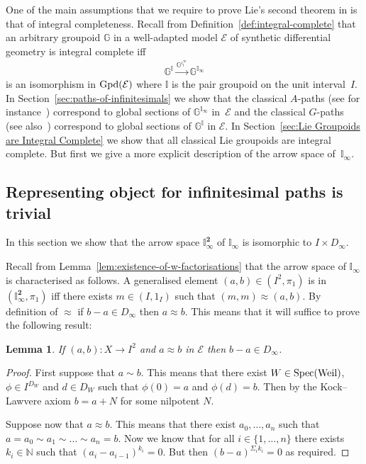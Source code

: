 \documentclass[pdftex]{sigma}
\numberwithin{equation}{section}
\newtheorem{Lemma}[Theorem]{Lemma}
\begin{document}
One of the main assumptions that we require to prove Lie's second theorem in \cite{burke-relative-to-local-models} is that of integral completeness.
Recall from Def\/inition~\ref{def:integral-complete} that an arbitrary groupoid $\mathbb{G}$ in a well-adapted model $\mathcal{E}$ of synthetic dif\/ferential geometry is integral complete if\/f
\begin{gather*}\mathbb{G}^{\mathbb{I}} \xrightarrow{\mathbb{G}^{\iota_{\mathbb{I}}^{\infty}}} \mathbb{G}^{\mathbb{I}_{\infty}}\end{gather*}
is an isomorphism in ${\rm Gpd}(\mathcal{E})$ where $\mathbb{I}$ is the pair groupoid on the unit interval~$I$. In Section~\ref{sec:paths-of-infinitesimals} we show that the classical $A$-paths (see for instance~\cite{2000JACKolkandJJDuistermaat44}) correspond to global sections of $\mathbb{G}^{\mathbb{I}_{\infty}}$ in~$\mathcal{E}$ and the classical $G$-paths (see also~\cite{2000JACKolkandJJDuistermaat44}) correspond to global sections of $\mathbb{G}^{\mathbb{I}}$ in $\mathcal{E}$. In Section~\ref{sec:Lie Groupoids are Integral Complete} we show that all classical Lie groupoids are integral complete. But f\/irst we give a more explicit description of the arrow space of~$\mathbb{I}_{\infty}$.

\subsection{Representing object for inf\/initesimal paths is trivial}\label{sec:arrow-space-of-A-paths}

In this section we show that the arrow space $\mathbb{I}_{\infty}^{\mathbf 2}$ of $\mathbb{I}_{\infty}$ is isomorphic to $I\times D_{\infty}$.

Recall from Lemma~\ref{lem:existence-of-w-factorisations} that the arrow space of $\mathbb{I}_{\infty}$ is characterised as follows. A generalised element $(a,b)\in (I^2,\pi_1)$ is in $(\mathbb{I}_{\infty}^{\mathbf 2},\pi_1)$ if\/f there exists $m\in (I,1_I)$ such that $(m,m)\approx (a,b)$. By def\/inition of $\approx$ if $b-a\in D_{\infty}$ then $a\approx b$. This means that it will suf\/f\/ice to prove the following result:
\begin{Lemma}\label{lem:b-a-nilpotent}
 If $(a,b)\colon X \rightarrow I^2$ and $a\approx b$ in $\mathcal{E}$ then $b-a\in D_{\infty}$.
\end{Lemma}
\begin{proof}
First suppose that $a\sim b$. This means that there exist $W\in {\rm Spec}({\rm Weil})$, $\phi\in I^{D_W}$ and $d\in D_W$ such that $\phi(0)=a$ and $\phi(d)=b$. Then by the Kock--Lawvere axiom $b=a+N$ for some nilpotent $N$.

Suppose now that $a\approx b$. This means that there exist $a_0,\dots ,a_n$ such that $a=a_0\sim a_1\sim \dots \sim a_n=b$. Now we know that for all $i\in\{1,\dots ,n\}$ there exists $k_i\in\mathbb{N}$ such that $(a_i-a_{i-1})^{k_i}=0$. But then $(b-a)^{\Sigma_i k_i}=0$ as required.
\end{proof}
\end{document}
